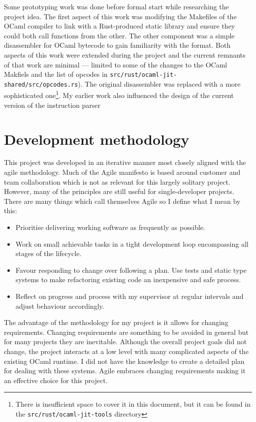 Some prototyping work was done before formal start while researching the project idea.
The first aspect of this work was modifying the Makefiles of the OCaml compiler to link with a
Rust-produced static library and ensure they could both call functions from the other. The other
component was a simple disassembler for OCaml bytecode to gain familiarity with the format. Both
aspects of this work were extended during the project and the current remnants of that work are
minimal --- limited to some of the changes to the OCaml Makfiels and the list of opcodes in
\texttt{src/rust/ocaml-jit-shared/src/opcodes.rs}).  The original disassembler was replaced with a
more sophisticated one\footnote{There is insufficient space to cover it in this document, but it
    can be found
    in the \texttt{src/rust/ocaml-jit-tools} directory}. My earlier work also influenced the design
of the current version of the instruction parser

\section{Development methodology}

This project was developed in an iterative manner most closely aligned with the agile
methodology. Much of the Agile manifesto is based around customer and team collaboration which is
not as relevant for this largely solitary project. However, many of the principles are still useful
for single-developer projects. There are many things which call themselves Agile so I define what I
mean by this:

\begin{itemize}
    \item Prioritise delivering working software as frequently as possible.
    \item Work on small achievable tasks in a tight development loop encompassing all stages of the
          lifecycle.
    \item Favour responding to change over following a plan. Use tests and static type systems to
          make refactoring existing code an inexpensive and safe process.
    \item Reflect on progress and process with my supervisor at regular intervals and adjust
          behaviour accordingly.
\end{itemize}

The advantage of the methodology for my project is it allows for changing requirements. Changing
requirements are  something to be avoided in general but for many projects they are inevitable.
Although
the overall project goals did not change, the project interacts at a low level with many
complicated
aspects of the existing OCaml runtime. I did not have the knowledge to create a detailed plan for
dealing with these systems. Agile embraces changing requirements making it an effective choice for
this project.

